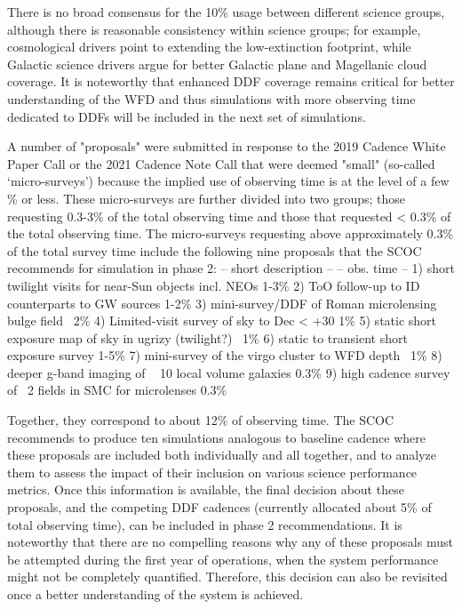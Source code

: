 There is no broad consensus for the 10\% usage between different science groups, although there is reasonable consistency within science groups; for example, cosmological drivers point to extending the low-extinction footprint, while Galactic science drivers argue for better Galactic plane and Magellanic cloud coverage. It is noteworthy that enhanced DDF coverage remains critical for better understanding of the WFD and thus simulations with more observing time dedicated to DDFs will be included in the next set of simulations. 

A number of "proposals" were submitted in response to the 2019 Cadence White Paper Call or the 2021 Cadence Note Call that were deemed "small" (so-called ‘micro-surveys’) because the implied use of observing time is at the level of a few \% or less. These micro-surveys are further divided into two groups; those requesting 0.3-3\% of the total observing time and those that requested < 0.3\% of the total observing time. The micro-surveys requesting above approximately 0.3\% of the total survey time include the following nine proposals that the SCOC recommends for simulation in phase 2:
             -- short description --                                       -- obs. time --
1) short twilight visits for near-Sun objects incl. NEOs         1-3\%
2) ToO follow-up to ID counterparts to GW sources             1-2\% 
3) mini-survey/DDF of Roman microlensing bulge field         ~2\%
4) Limited-visit survey of sky to Dec < +30                              1\%
5) static short exposure map of sky in ugrizy (twilight?)        ~1\%
6) static to transient short exposure survey                          1-5\%
7) mini-survey of the virgo cluster to WFD depth                   ~1\%
8) deeper g-band imaging of ~ 10 local volume galaxies      0.3\%
9) high cadence survey of ~2 fields in SMC for microlenses 0.3\%
  
Together, they correspond to about 12\% of observing time. The SCOC recommends to produce ten simulations analogous to baseline cadence where these proposals are included both individually and all together, and to analyze them to assess the impact of their inclusion on various science performance metrics. Once this information is available, the final decision about these proposals, and the competing DDF cadences (currently allocated about 5\% of total observing time), can be included in phase 2 recommendations. It is noteworthy that there are no compelling reasons why any of these proposals must be attempted during the first year of operations, when the system performance might not be completely quantified. Therefore, this decision can also be revisited once a better understanding of the system is achieved.

